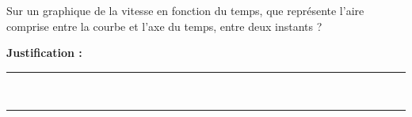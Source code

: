 Sur un graphique de la vitesse en fonction du temps, que représente l'aire comprise entre la courbe et l'axe du temps, entre deux instants ?

\choices

\noindent\textbf{Justification :} \hrulefill \\[2.5ex]
\rule{\linewidth}{0.4pt} \\[2.5ex]
\rule{\linewidth}{0.4pt}
\vfill
